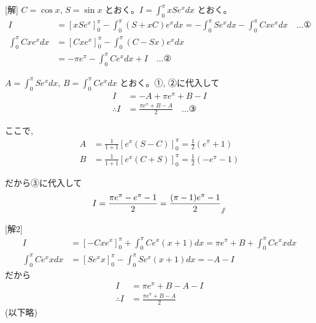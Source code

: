 \documentclass[../main.tex]{subfiles}
\begin{document}
[解] $C = \cos x, \, S = \sin x$ とおく。$I = \int_0^\pi x S e^x dx$ とおく。
\[
  \begin{aligned}
    I &= [x S e^x]_0^\pi - \int_0^\pi (S + x C) e^x dx = -\int_0^\pi S e^x dx - \int_0^\pi C x e^x dx \quad \dots \text{①} \\[5pt]
    \int_0^\pi C x e^x dx &= [C x e^x]_0^\pi - \int_0^\pi (C - S x) e^x dx \\[5pt]
    &= -\pi e^\pi - \int_0^\pi C e^x dx + I \quad \dots \text{②}
  \end{aligned}
\]

$A = \int_0^\pi S e^x dx, \, B = \int_0^\pi C e^x dx$ とおく。①, ②に代入して
\[
  \begin{aligned}
    I &= -A + \pi e^\pi + B - I \\[5pt]
    \therefore I &= \frac{\pi e^\pi + B - A}{2} \quad \dots \text{③}
  \end{aligned}
\]

ここで,
\[
  \begin{aligned}
    A &= \frac{1}{1+1} [e^x(S-C)]_0^\pi = \frac{1}{2}(e^\pi + 1) \\[5pt]
    B &= \frac{1}{1+1} [e^x(C+S)]_0^\pi = \frac{1}{2}(-e^\pi - 1)
  \end{aligned}
\]

だから③に代入して
\[ I = \frac{\pi e^\pi - e^\pi - 1}{2} = \frac{(\pi-1)e^\pi - 1}{2} _{\mathbin{/\mkern-6mu/}} \]

[解2]
\[
  \begin{aligned}
    I &= [-C x e^x]_0^\pi + \int_0^\pi C e^x(x+1) dx = \pi e^\pi + B + \int_0^\pi C e^x x dx \\[5pt]
    \int_0^\pi C e^x x dx &= [S e^x x]_0^\pi - \int_0^\pi S e^x (x+1) dx = -A - I
  \end{aligned}
\]
だから
\[
  \begin{aligned}
    I &= \pi e^\pi + B - A - I \\[5pt]
    \therefore I &= \frac{\pi e^\pi + B - A}{2}
  \end{aligned}
\]
(以下略)
\end{document}
